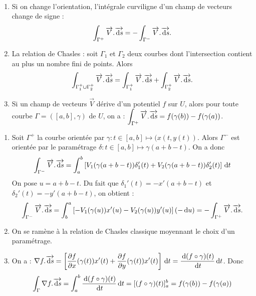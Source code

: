 \documentclass[class=report,crop=false]{standalone}
\begin{document}
\begin{proposition}\
\begin{enumerate}
\item Si on change l'orientation, l'intégrale curviligne d'un champ de vecteurs change de signe :
$$\int _{\Gamma ^+}\overrightarrow{V}.\overrightarrow{\,\mathrm{d} s}=-\int _{\Gamma ^-}\overrightarrow{V}.\overrightarrow{\,\mathrm{d} s}.$$
\item La relation de Chasles : soit $\Gamma _1$ et $\Gamma _2$ deux courbes dont l'intersection contient au plus un nombre fini de points. Alors 
$$\displaystyle \int _{\Gamma _1^+\cup \Gamma _2^+}\overrightarrow{V}.\overrightarrow{\,\mathrm{d} s}=\int _{\Gamma _1^+}\overrightarrow{V}.\overrightarrow{\,\mathrm{d} s}+\int _{\Gamma _2^+}\overrightarrow{V}.\overrightarrow{\,\mathrm{d} s}.$$
\item Si un champ de vecteurs $\overrightarrow{V}$ dérive d'un potentiel $f$ sur $U$, alors pour toute courbe $\Gamma =([a,b],\gamma )$ de $U$, on a : $\displaystyle \int _{\Gamma ^+}\overrightarrow{V}.\overrightarrow{\,\mathrm{d} s}=f(\gamma (b))-f(\gamma (a))$.
\end{enumerate}
\end{proposition}

\vskip4mm

\begin{enumerate}
\item Soit $\Gamma ^+$ la courbe orientée par $\gamma :t\in [a,b]\mapsto (x(t,y(t))$. Alors $\Gamma ^-$ est orientée par le paramétrage $\delta :t\in [a,b]\mapsto \gamma(a+b-t)$. On a donc
$$\int _{\Gamma ^-}\overrightarrow{V}.\overrightarrow{\,\mathrm{d} s}=\int _a^b\left[V_1(\gamma (a+b-t))\delta _1'(t)+V_2(\gamma (a+b-t))\delta _2'(t)\right]\,\mathrm{d} t$$
On pose $u=a+b-t$. Du fait que $\delta _1'(t)=-x'(a+b-t)$ et $\delta _2'(t)=-y'(a+b-t)$, on obtient :
$$\int _{\Gamma ^-}\overrightarrow{V}.\overrightarrow{\,\mathrm{d} s}=\int _b^a\left[-V_1(\gamma (u))x'(u)-V_2(\gamma (u))y'(u)\right](-\,\mathrm{d} u)=-\int _{\Gamma ^+}\overrightarrow{V}.\overrightarrow{\,\mathrm{d} s}.$$

\item On se ramène à la relation de Chasles classique moyennant le choix d'un paramétrage.

\item On a : $\displaystyle \nabla f.\overrightarrow{\,\mathrm{d} s}=\left[\frac{\partial f}{\partial x}(\gamma (t))x'(t)+\frac{\partial f}{\partial y}(\gamma (t))x'(t)\right]\,\mathrm{d} t=\frac{\,\mathrm{d} (f\circ \gamma )(t)}{\,\mathrm{d} t}\,\mathrm{d} t$. Donc
$$\int _{\Gamma }\nabla f.\overrightarrow{\,\mathrm{d} s}=\int _a^b\frac{\,\mathrm{d} (f\circ \gamma )(t)}{\,\mathrm{d} t}\,\mathrm{d} t=[(f\circ \gamma )(t)]_a^b=f(\gamma (b))-f(\gamma (a))$$
\end{enumerate}
\end{document}
